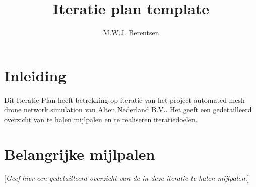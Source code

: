 \documentclass[a4paper, 11pt, oneside]{article}
\author{M.W.J. Berentsen}
\title{Iteratie plan template}
\begin{document}
	\maketitle
\section{Inleiding}	

Dit Iteratie Plan heeft betrekking op iteratie   van het project automated mesh drone network simulation van Alten Nederland B.V.. Het geeft een gedetailleerd overzicht van te halen mijlpalen en te realiseren iteratiedoelen.

\section{Belangrijke mijlpalen}
{[}\textit{Geef hier een gedetailleerd overzicht van de in deze iteratie te halen mijlpalen.}{]}
\end{document}
